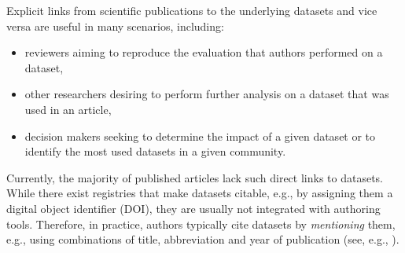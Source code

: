 \documentclass{IOS-Book-Article}
\begin{document}
Explicit links from scientific publications to the underlying datasets and vice versa are useful in many scenarios, including:
\begin{itemize}
	\item reviewers aiming to reproduce the evaluation that authors performed on a dataset, 
	\item other researchers desiring to perform further analysis on a dataset that was used in an article,
	\item decision makers seeking to determine the impact of a given dataset or to identify the most used datasets in a given community.
\end{itemize}

Currently, the majority of published articles lack such direct links to datasets.
While there exist registries that make datasets citable, e.g., by assigning them a digital object identifier (DOI), they are usually not integrated with authoring tools.
Therefore, in practice, authors typically cite datasets by \emph{mentioning} them, e.g., using  
combinations of title, abbreviation and year of publication (see, e.g., \citet{Mathiak2015}).  
\end{document}

